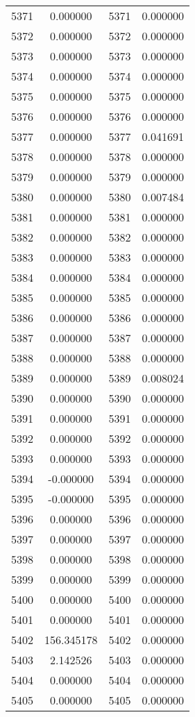 \documentclass[12pt]{article}
\begin{document}
\begin{longtable}{@{}cccc@{}}
5371 & 0.000000 & 5371 & 0.000000 \\
5372 & 0.000000 & 5372 & 0.000000 \\
5373 & 0.000000 & 5373 & 0.000000 \\
5374 & 0.000000 & 5374 & 0.000000 \\
5375 & 0.000000 & 5375 & 0.000000 \\
5376 & 0.000000 & 5376 & 0.000000 \\
5377 & 0.000000 & 5377 & 0.041691 \\
5378 & 0.000000 & 5378 & 0.000000 \\
5379 & 0.000000 & 5379 & 0.000000 \\
5380 & 0.000000 & 5380 & 0.007484 \\
5381 & 0.000000 & 5381 & 0.000000 \\
5382 & 0.000000 & 5382 & 0.000000 \\
5383 & 0.000000 & 5383 & 0.000000 \\
5384 & 0.000000 & 5384 & 0.000000 \\
5385 & 0.000000 & 5385 & 0.000000 \\
5386 & 0.000000 & 5386 & 0.000000 \\
5387 & 0.000000 & 5387 & 0.000000 \\
5388 & 0.000000 & 5388 & 0.000000 \\
5389 & 0.000000 & 5389 & 0.008024 \\
5390 & 0.000000 & 5390 & 0.000000 \\
5391 & 0.000000 & 5391 & 0.000000 \\
5392 & 0.000000 & 5392 & 0.000000 \\
5393 & 0.000000 & 5393 & 0.000000 \\
5394 & -0.000000 & 5394 & 0.000000 \\
5395 & -0.000000 & 5395 & 0.000000 \\
5396 & 0.000000 & 5396 & 0.000000 \\
5397 & 0.000000 & 5397 & 0.000000 \\
5398 & 0.000000 & 5398 & 0.000000 \\
5399 & 0.000000 & 5399 & 0.000000 \\
5400 & 0.000000 & 5400 & 0.000000 \\
5401 & 0.000000 & 5401 & 0.000000 \\
5402 & 156.345178 & 5402 & 0.000000 \\
5403 & 2.142526 & 5403 & 0.000000 \\
5404 & 0.000000 & 5404 & 0.000000 \\
5405 & 0.000000 & 5405 & 0.000000 \\

\end{longtable}
\end{document}
